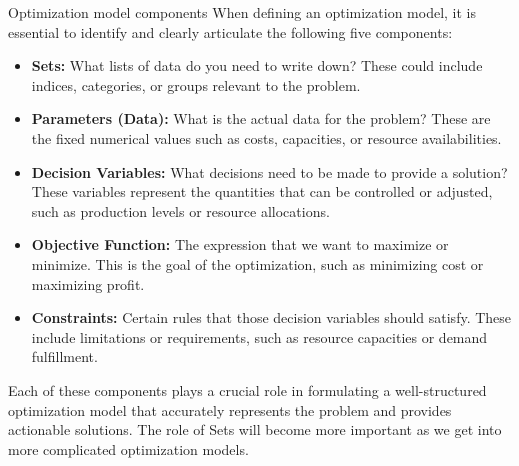 \begin{definition}{Optimization model components}{}
When defining an optimization model, it is essential to identify and clearly articulate the following five components:

\begin{itemize}
    \item \textbf{Sets:} What lists of data do you need to write down? These could include indices, categories, or groups relevant to the problem.
    \item \textbf{Parameters (Data):} What is the actual data for the problem? These are the fixed numerical values such as costs, capacities, or resource availabilities.
    \item \textbf{Decision Variables:} What decisions need to be made to provide a solution? These variables represent the quantities that can be controlled or adjusted, such as production levels or resource allocations.
    \item \textbf{Objective Function:} The expression that we want to maximize or minimize. This is the goal of the optimization, such as minimizing cost or maximizing profit.
    \item \textbf{Constraints:} Certain rules that those decision variables should satisfy. These include limitations or requirements, such as resource capacities or demand fulfillment.
\end{itemize}

Each of these components plays a crucial role in formulating a well-structured optimization model that accurately represents the problem and provides actionable solutions.  The role of Sets will become more important as we get into more complicated optimization models.
\end{definition}

